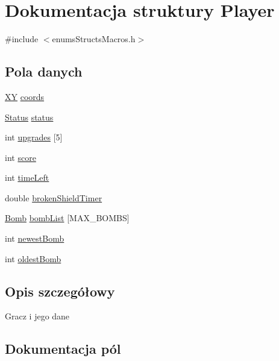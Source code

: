\hypertarget{struct_player}{}\section{Dokumentacja struktury Player}
\label{struct_player}


{\ttfamily \#include $<$enums\+Structs\+Macros.\+h$>$}

\subsection*{Pola danych}
\begin{DoxyCompactItemize}
\item 
\mbox{\hyperlink{struct_x_y}{XY}} \mbox{\hyperlink{struct_player_a60fad3578d62e8d11e65911337a13244}{coords}}
\item 
\mbox{\hyperlink{enums_structs_macros_8h_a67a0db04d321a74b7e7fcfd3f1a3f70b}{Status}} \mbox{\hyperlink{struct_player_aeb08943a32834515e66222d2e948292d}{status}}
\item 
int \mbox{\hyperlink{struct_player_ac7640ac0f1e50faad29e878fc91fc844}{upgrades}} \mbox{[}5\mbox{]}
\item 
int \mbox{\hyperlink{struct_player_ace6abae8d66534ad0a1fd6458f786a6e}{score}}
\item 
int \mbox{\hyperlink{struct_player_a9f5df822bb76dbd172b957db9bb33458}{time\+Left}}
\item 
double \mbox{\hyperlink{struct_player_aca0817efc57fca8f014e40d2c108f7bb}{broken\+Shield\+Timer}}
\item 
\mbox{\hyperlink{struct_bomb}{Bomb}} \mbox{\hyperlink{struct_player_a8fb3de478f4a924ee6b9c22a168d1807}{bomb\+List}} \mbox{[}M\+A\+X\+\_\+\+B\+O\+M\+BS\mbox{]}
\item 
int \mbox{\hyperlink{struct_player_a4a2fcb0a816a0b9121a5ba00d429c55a}{newest\+Bomb}}
\item 
int \mbox{\hyperlink{struct_player_a284c4526d6934eef1ea29f4aa61ea9e9}{oldest\+Bomb}}
\end{DoxyCompactItemize}


\subsection{Opis szczegółowy}
Gracz i jego dane 

\subsection{Dokumentacja pól}
\mbox{\label{struct_player_a8fb3de478f4a924ee6b9c22a168d1807}} 
